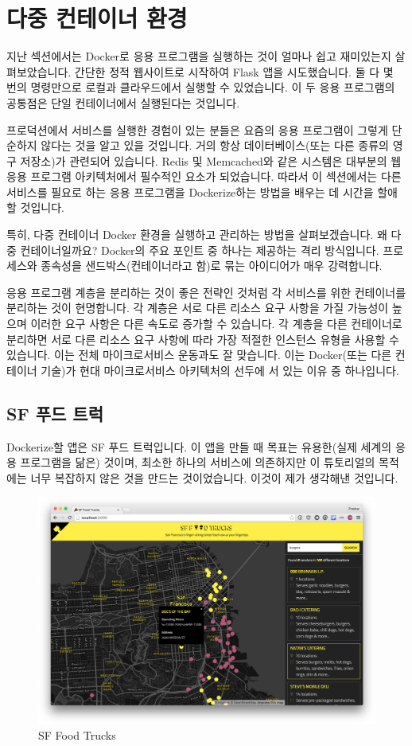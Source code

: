 \chapter{다중 컨테이너 환경}
지난 섹션에서는 Docker로 응용 프로그램을 실행하는 것이 얼마나 쉽고 재미있는지 살펴보았습니다. 간단한 정적 웹사이트로 시작하여 Flask 앱을 시도했습니다. 둘 다 몇 번의 명령만으로 로컬과 클라우드에서 실행할 수 있었습니다. 이 두 응용 프로그램의 공통점은 단일 컨테이너에서 실행된다는 것입니다.

프로덕션에서 서비스를 실행한 경험이 있는 분들은 요즘의 응용 프로그램이 그렇게 단순하지 않다는 것을 알고 있을 것입니다. 거의 항상 데이터베이스(또는 다른 종류의 영구 저장소)가 관련되어 있습니다. Redis 및 Memcached와 같은 시스템은 대부분의 웹 응용 프로그램 아키텍처에서 필수적인 요소가 되었습니다. 따라서 이 섹션에서는 다른 서비스를 필요로 하는 응용 프로그램을 Dockerize하는 방법을 배우는 데 시간을 할애할 것입니다.

특히, 다중 컨테이너 Docker 환경을 실행하고 관리하는 방법을 살펴보겠습니다. 왜 다중 컨테이너일까요? Docker의 주요 포인트 중 하나는 제공하는 격리 방식입니다. 프로세스와 종속성을 샌드박스(컨테이너라고 함)로 묶는 아이디어가 매우 강력합니다.

응용 프로그램 계층을 분리하는 것이 좋은 전략인 것처럼 각 서비스를 위한 컨테이너를 분리하는 것이 현명합니다. 각 계층은 서로 다른 리소스 요구 사항을 가질 가능성이 높으며 이러한 요구 사항은 다른 속도로 증가할 수 있습니다. 각 계층을 다른 컨테이너로 분리하면 서로 다른 리소스 요구 사항에 따라 가장 적절한 인스턴스 유형을 사용할 수 있습니다. 이는 전체 마이크로서비스 운동과도 잘 맞습니다. 이는 Docker(또는 다른 컨테이너 기술)가 현대 마이크로서비스 아키텍처의 선두에 서 있는 이유 중 하나입니다.

\section{SF 푸드 트럭}
Dockerize할 앱은 SF 푸드 트럭입니다. 이 앱을 만들 때 목표는 유용한(실제 세계의 응용 프로그램을 닮은) 것이며, 최소한 하나의 서비스에 의존하지만 이 튜토리얼의 목적에는 너무 복잡하지 않은 것을 만드는 것이었습니다. 이것이 제가 생각해낸 것입니다.

\begin{figure}
\includegraphics[width=\textwidth]{images/foodtrucks.png}
\caption{SF Food Trucks}
\end{figure}

